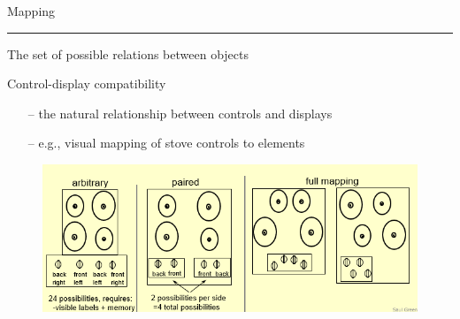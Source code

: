 \documentclass[pdf]{beamer}
\begin{document}
\begin{frame}
    {Mapping}{\textcolor{red}{\rule{12cm}{1.2pt}}}
    
    The set of possible relations between objects \par
    Control-display compatibility \par \par
    \begin{itemize}
    \item[\textcolor{black}{--}] the natural relationship between controls and displays
      \item[\textcolor{black}{--}] e.g., visual mapping of stove controls to elements
     

    \end{itemize}
    
    \begin{figure}[b]
    	\includegraphics[scale = 0.69, center]{18_Picture.png}
    \end{figure}
  
\end{frame}



\end{document}
